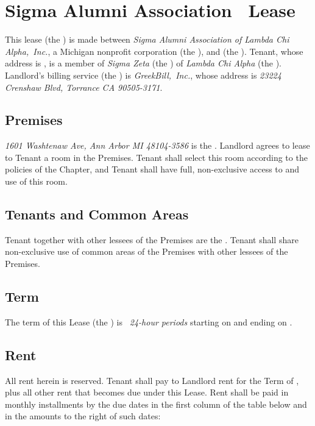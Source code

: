 \documentclass{article}
\begin{document}
\section*{Sigma Alumni Association \leaseDescription\ Lease}

This lease (the ) is made between
\emph{Sigma Alumni Association of Lambda Chi Alpha,~Inc.}, a Michigan nonprofit
corporation (the ), and
\emph{\tenantName} (the ). Tenant, whose address
is \emph{\tenantAddress}, is a member of \emph{Sigma Zeta} (the
) of \emph{Lambda Chi Alpha} (the
). Landlord’s billing service (the
) is \emph{GreekBill,~Inc.}, whose
address is \emph{23224 Crenshaw Blvd, Torrance CA 90505-3171}.

\subsection{Premises}
\emph{1601 Washtenaw Ave, Ann Arbor MI 48104-3586} is the
. Landlord agrees to lease to Tenant a room in
the Premises. Tenant shall select this room according to the policies of the
Chapter, and Tenant shall have full, non-exclusive access to and use of this
room.

\subsection{Tenants and Common Areas}
Tenant together with other lessees of the Premises are the
. Tenant shall share non-exclusive use of common
areas of the Premises with other lessees of the Premises.

\subsection{Term}
The term of this Lease (the ) is
\emph{\the\termDuration\ 24-hour periods} starting on
\emph{} and ending on
\emph{}.

\subsection{Rent}
All rent herein is reserved. Tenant shall pay to Landlord rent for the Term of
\emph{\rentTotal}, plus all other rent that becomes due under this Lease. Rent
shall be paid in monthly installments by the due dates in the first column of
the table below and in the amounts to the right of such dates:
\end{document}
